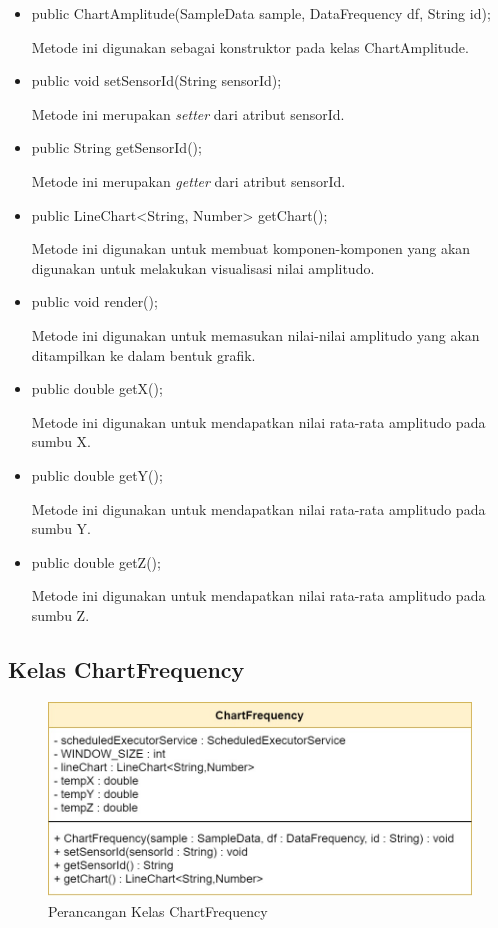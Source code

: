 \begin{itemize}
    \item public ChartAmplitude(SampleData sample, DataFrequency df, String id);
    
    Metode ini digunakan sebagai konstruktor pada kelas ChartAmplitude.
    
    \item public void setSensorId(String sensorId);
    
    Metode ini merupakan \textit{setter} dari atribut sensorId.
    
    \item public String getSensorId();
    
    Metode ini merupakan \textit{getter} dari atribut sensorId.
    
    \item public LineChart<String, Number> getChart();
    
    Metode ini digunakan untuk membuat komponen-komponen yang akan digunakan untuk melakukan visualisasi nilai amplitudo.
    
    \item public void render();
    
    Metode ini digunakan untuk memasukan nilai-nilai amplitudo yang akan ditampilkan ke dalam bentuk grafik.
    
    \item public double getX();
    
    Metode ini digunakan untuk mendapatkan nilai rata-rata amplitudo pada sumbu X.
    
     \item public double getY();
    
    Metode ini digunakan untuk mendapatkan nilai rata-rata amplitudo pada sumbu Y.
    
     \item public double getZ();
    
    Metode ini digunakan untuk mendapatkan nilai rata-rata amplitudo pada sumbu Z.
\end{itemize}


\subsection{Kelas ChartFrequency}
\begin{figure}[H] 
	\centering  
	\includegraphics[scale=0.35]{Gambar/Controller_ChartFrequency.jpg}
	\caption[Perancangan Kelas ChartFrequency]{Perancangan Kelas ChartFrequency}
	\label{fig:controller_chartFrequency} 
\end{figure}

